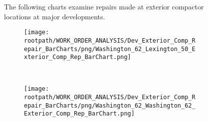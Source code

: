 \begin{figure}[h]
                                \sf
                                \raggedright
                                The following charts examine repairs made at exterior compactor locations at major developments.
                                \sf
                                \begin{subfigure}{0.45\textwidth}
                                        \texttt{[image: \\rootpath/WORK\_ORDER\_ANALYSIS/Dev\_Exterior\_Comp\_Repair\_BarCharts/png/Washington\_62\_Lexington\_50\_Exterior\_Comp\_Rep\_BarChart.png]}
                                        \end{subfigure}
                                        ~
                                        \begin{subfigure}{0.45\textwidth}
                                        \texttt{[image: \\rootpath/WORK\_ORDER\_ANALYSIS/Dev\_Exterior\_Comp\_Repair\_BarCharts/png/Washington\_62\_Washington\_62\_Exterior\_Comp\_Rep\_BarChart.png]}
                                        \end{subfigure}
                                        
                                        \end{figure}
